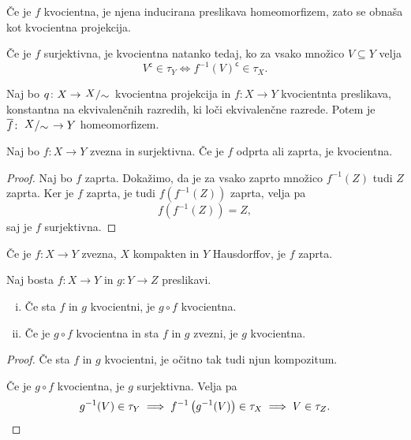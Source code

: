 \begin{opomba}
Če je $f$ kvocientna, je njena inducirana preslikava homeomorfizem,
zato se obnaša kot kvocientna projekcija.
\end{opomba}

\begin{opomba}
Če je $f$ surjektivna, je kvocientna natanko tedaj, ko za vsako
množico $V \subseteq Y$ velja
\[
V^{\mathsf{c}} \in \tau_Y \iff f^{-1}(V)^{\mathsf{c}} \in \tau_X.
\]
\end{opomba}

\begin{izrek}
Naj bo $q \colon X \to \kvoc{X}{\sim}$ kvocientna projekcija in
$f \colon X \to Y$ kvocientnta preslikava, konstantna na
ekvivalenčnih razredih, ki loči ekvivalenčne razrede. Potem je
$\overline{f} \colon \kvoc{X}{\sim} \to Y$ homeomorfizem.
\end{izrek}

\obvs

\begin{lema}
Naj bo $f \colon X \to Y$ zvezna in surjektivna. Če je $f$ odprta
ali zaprta, je kvocientna.
\end{lema}

\begin{proof}
Naj bo $f$ zaprta. Dokažimo, da je za vsako zaprto množico
$f^{-1}(Z)$ tudi $Z$ zaprta. Ker je $f$ zaprta, je tudi
$f\left(f^{-1}(Z)\right) $ zaprta, velja pa
\[
f\left(f^{-1}(Z)\right) = Z,
\]
saj je $f$ surjektivna.
\end{proof}

\begin{opomba}
Če je $f \colon X \to Y$ zvezna, $X$ kompakten in $Y$ Hausdorffov,
je $f$ zaprta.
\end{opomba}

\begin{trditev}
Naj bosta $f \colon X \to Y$ in $g \colon Y \to Z$ preslikavi.

\begin{enumerate}[i)]
\item Če sta $f$ in $g$ kvocientni, je $g \circ f$ kvocientna.
\item Če je $g \circ f$ kvocientna in sta $f$ in $g$ zvezni, je $g$
kvocientna.
\end{enumerate}
\end{trditev}

\begin{proof}
Če sta $f$ in $g$ kvocientni, je očitno tak tudi njun kompozitum.

Če je $g \circ f$ kvocientna, je $g$ surjektivna. Velja pa
\[
g^{-1}(V) \in \tau_Y \implies
f^{-1}\left(g^{-1}(V)\right) \in \tau_X \implies
V \in \tau_Z. \qedhere
\]
\end{proof}
